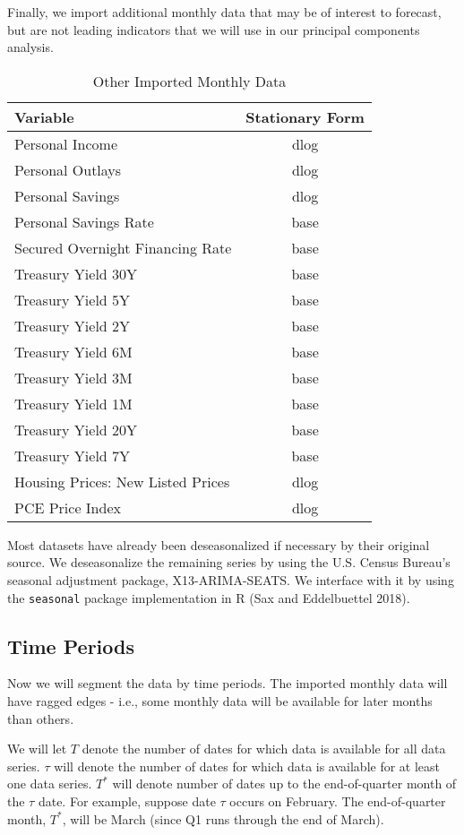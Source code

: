 \documentclass[11pt, letterpaper]{article}\usepackage[]{graphicx}\usepackage[]{color}
\begin{document}
Finally, we import additional monthly data that may be of interest to forecast, but are not leading indicators that we will use in our principal components analysis.
\begin{table}[H]
\centering
\begingroup\scriptsize
\begin{tabular}{lc}
  \hline
Variable & Stationary Form \\ 
  \hline
Personal Income & dlog \\ 
  Personal Outlays & dlog \\ 
  Personal Savings & dlog \\ 
  Personal Savings Rate & base \\ 
  Secured Overnight Financing Rate & base \\ 
  Treasury Yield 30Y & base \\ 
  Treasury Yield 5Y & base \\ 
  Treasury Yield 2Y & base \\ 
  Treasury Yield 6M & base \\ 
  Treasury Yield 3M & base \\ 
  Treasury Yield 1M & base \\ 
  Treasury Yield 20Y & base \\ 
  Treasury Yield 7Y & base \\ 
  Housing Prices: New Listed Prices & dlog \\ 
  PCE Price Index & dlog \\ 
   \hline
\end{tabular}
\endgroup
\caption{Other Imported Monthly Data} 
\end{table}


Most datasets have already been deseasonalized if necessary by their original source. We deseasonalize the remaining series by using the U.S. Census Bureau's seasonal adjustment package, X13-ARIMA-SEATS. We interface with it by using the \texttt{seasonal} package implementation in R (Sax and Eddelbuettel 2018).

\subsection{Time Periods}
Now we will segment the data by time periods. The imported monthly data will have ragged edges - i.e., some monthly data will be available for later months than others.

We will let $T$ denote the number of dates for which data is available for all data series. $\tau$ will denote the number of dates for which data is available for at least one data series. $T^*$ will denote number of dates up to the end-of-quarter month of the $\tau$ date. For example, suppose date $\tau$ occurs on February. The end-of-quarter month, $T^*$, will be March (since Q1 runs through the end of March). 
\end{document}
